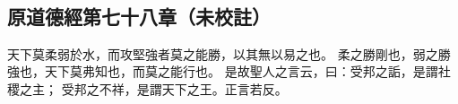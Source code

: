 ﻿%
%

\chapter{~}

\section{原道德經第七十八章（未校註）}

\begin{withgezhu}

\zhsong


天下莫柔弱於水，而攻堅強者莫之能勝，以其無以易之也。
\textcolor{tongjia-color}{柔之勝剛也，弱之勝強也}，天下莫弗知也，而莫之能行也。
是故聖人之言云，曰：受邦之詬，\textcolor{tongjia-color}{是謂社稷之主}；
受邦之不祥，\textcolor{tongjia-color}{是謂天下之王}。正言若反。

\end{withgezhu}

